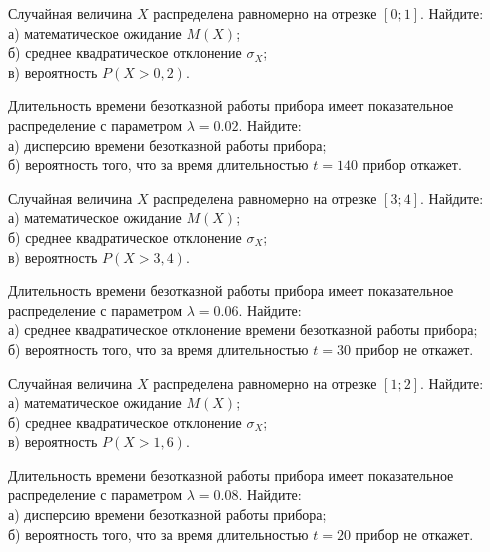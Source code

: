 \vfill

\newpage\setcounter{zad}{0}

\z Случайная величина $X$ распределена равномерно на отрезке $[0; 1]$. Найдите: \\ \quad а) математическое ожидание $M(X)$; \\ \quad б) среднее квадратическое отклонение $\sigma_X$; \\ \quad в) вероятность $P(X>0{,}2)$.


\vfill

\z Длительность времени безотказной работы прибора имеет показательное распределение с параметром $\lambda = 0.02$. Найдите: \\ \quad а) дисперсию времени безотказной работы прибора; \\ \quad б) вероятность того, что за время длительностью $t = 140$ прибор откажет.
 

\vfill

\newpage\setcounter{zad}{0}

\z Случайная величина $X$ распределена равномерно на отрезке $[3; 4]$. Найдите: \\ \quad а) математическое ожидание $M(X)$; \\ \quad б) среднее квадратическое отклонение $\sigma_X$; \\ \quad в) вероятность $P(X>3{,}4)$.


\vfill

\z Длительность времени безотказной работы прибора имеет показательное распределение с параметром $\lambda = 0.06$. Найдите: \\ \quad а) среднее квадратическое отклонение времени безотказной работы прибора; \\ \quad б) вероятность того, что за время длительностью $t = 30$ прибор не откажет.
 

\vfill

\newpage\setcounter{zad}{0}

\z Случайная величина $X$ распределена равномерно на отрезке $[1; 2]$. Найдите: \\ \quad а) математическое ожидание $M(X)$; \\ \quad б) среднее квадратическое отклонение $\sigma_X$; \\ \quad в) вероятность $P(X>1{,}6)$.


\vfill

\z Длительность времени безотказной работы прибора имеет показательное распределение с параметром $\lambda = 0.08$. Найдите: \\ \quad а) дисперсию времени безотказной работы прибора; \\ \quad б) вероятность того, что за время длительностью $t = 20$ прибор не откажет.
 

